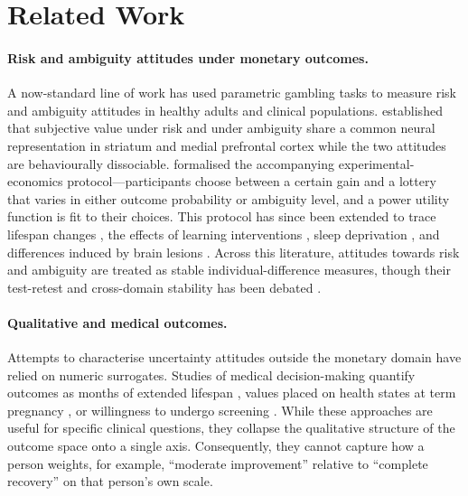 \section{Related Work}

\paragraph{Risk and ambiguity attitudes under monetary outcomes.}
A now-standard line of work has used parametric gambling tasks to measure risk and ambiguity attitudes in healthy adults and clinical populations. \citet{levy2010neural} established that subjective value under risk and under ambiguity share a common neural representation in striatum and medial prefrontal cortex while the two attitudes are behaviourally dissociable. \citet{levy2012measuring} formalised the accompanying experimental-economics protocol---participants choose between a certain gain and a lottery that varies in either outcome probability or ambiguity level, and a power utility function is fit to their choices. This protocol has since been extended to trace lifespan changes \citep{tymula2013lifespan}, the effects of learning interventions \citep{jia2020learning}, sleep deprivation \citep{mullette2015sleep}, and differences induced by brain lesions \citep{clark2008vmpfc}. Across this literature, attitudes towards risk and ambiguity are treated as stable individual-difference measures, though their test-retest and cross-domain stability has been debated \citep{jia2020learning}.

\paragraph{Qualitative and medical outcomes.}
Attempts to characterise uncertainty attitudes outside the monetary domain have relied on numeric surrogates. Studies of medical decision-making quantify outcomes as months of extended lifespan \citep{basu2018vio}, values placed on health states at term pregnancy \citep{bijlenga2007balance}, or willingness to undergo screening \citep{yeh2015dense,james2017prostate}. While these approaches are useful for specific clinical questions, they collapse the qualitative structure of the outcome space onto a single axis. Consequently, they cannot capture how a person weights, for example, ``moderate improvement'' relative to ``complete recovery'' on that person's own scale.

